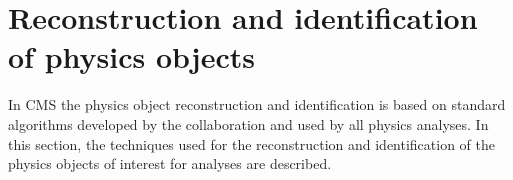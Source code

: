 \chapter{Reconstruction and identification of physics objects}\label{chap3}
\thispagestyle{empty}

In CMS the physics object reconstruction and identification is based on standard algorithms developed by the collaboration and used by all physics analyses. In this section, the techniques used for the reconstruction and identification of the physics objects of interest for \hwwllnn analyses are described.








